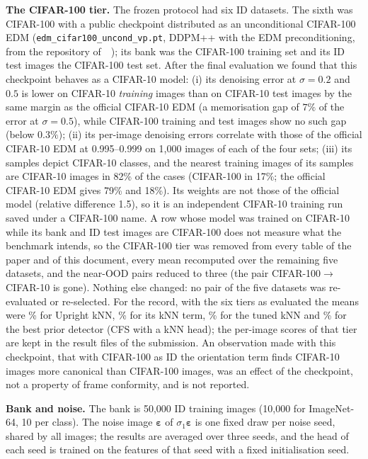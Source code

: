 \documentclass[10pt]{article}
\newcommand{\veps}{\boldsymbol{\varepsilon}}
\begin{document}
\textbf{The CIFAR-100 tier.} The frozen protocol had six ID datasets. The sixth was CIFAR-100 with a public checkpoint distributed as an unconditional CIFAR-100 EDM (\texttt{edm\_cifar100\_uncond\_vp.pt}, DDPM++ with the EDM preconditioning, from the repository of~\citeauthor{chen2024robust}~); its bank was the CIFAR-100 training set and its ID test images the CIFAR-100 test set. After the final evaluation we found that this checkpoint behaves as a CIFAR-10 model: (i) its denoising error at $\sigma=0.2$ and $0.5$ is lower on CIFAR-10 \emph{training} images than on CIFAR-10 test images by the same margin as the official CIFAR-10 EDM (a memorisation gap of $7\%$ of the error at $\sigma=0.5$), while CIFAR-100 training and test images show no such gap (below $0.3\%$); (ii) its per-image denoising errors correlate with those of the official CIFAR-10 EDM at 0.995--0.999 on 1{,}000 images of each of the four sets; (iii) its samples depict CIFAR-10 classes, and the nearest training images of its samples are CIFAR-10 images in 82\% of the cases (CIFAR-100 in 17\%; the official CIFAR-10 EDM gives 79\% and 18\%). Its weights are not those of the official model (relative difference 1.5), so it is an independent CIFAR-10 training run saved under a CIFAR-100 name. A row whose model was trained on CIFAR-10 while its bank and ID test images are CIFAR-100 does not measure what the benchmark intends, so the CIFAR-100 tier was removed from every table of the paper and of this document, every mean recomputed over the remaining five datasets, and the near-OOD pairs reduced to three (the pair CIFAR-100$\to$CIFAR-10 is gone). Nothing else changed: no pair of the five datasets was re-evaluated or re-selected. For the record, with the six tiers as evaluated the means were \sixOursMean\% for Upright kNN, \sixContentMean\% for its kNN term, \sixTunedMean\% for the tuned kNN and \sixBestPriorMean\% for the best prior detector (CFS with a kNN head); the per-image scores of that tier are kept in the result files of the submission. An observation made with this checkpoint, that with CIFAR-100 as ID the orientation term finds CIFAR-10 images more canonical than CIFAR-100 images, was an effect of the checkpoint, not a property of frame conformity, and is not reported.

\textbf{Bank and noise.} The bank is 50{,}000 ID training images (10{,}000 for ImageNet-64, 10 per class). The noise image $\veps$ of $\sigma_1\veps$ is one fixed draw per noise seed, shared by all images; the results are averaged over three seeds, and the head of each seed is trained on the features of that seed with a fixed initialisation seed.
\end{document}
